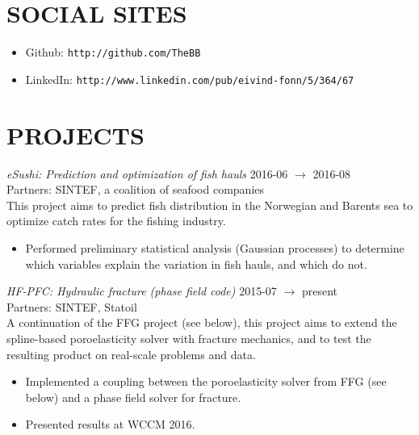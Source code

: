 \documentclass[line,margin]{res}
\begin{document}
\begin{resume}



\section{SOCIAL SITES}

\begin{itemize}
\item Github: \texttt{http://github.com/TheBB}
\item LinkedIn: \texttt{http://www.linkedin.com/pub/eivind-fonn/5/364/67}
\end{itemize}

\section{PROJECTS}

{\em eSushi: Prediction and optimization of fish hauls}
\hfill 2016-06 $\to$ 2016-08 \\
{\small Partners: SINTEF, a coalition of seafood companies} \\
This project aims to predict fish distribution in the Norwegian and Barents sea
to optimize catch rates for the fishing industry.
\begin{itemize}
\item Performed preliminary statistical analysis (Gaussian processes) to
  determine which variables explain the variation in fish hauls, and which do
  not.
\end{itemize}

{\em HF-PFC: Hydraulic fracture (phase field code)}
\hfill 2015-07 $\to$ present \\
{\small Partners: SINTEF, Statoil} \\
A continuation of the FFG project (see below), this project aims to extend the
spline-based poroelasticity solver with fracture mechanics, and to test the
resulting product on real-scale problems and data.
\begin{itemize}
\item Implemented a coupling between the poroelasticity solver from FFG (see
  below) and a phase field solver for fracture.
\item Presented results at  WCCM 2016.
\end{itemize}


\end{resume}
\end{document}
